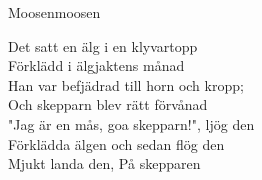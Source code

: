 \begin{song}{Moosen}{moosen}
\begin{vers}
Det satt en älg i en klyvartopp\\
Förklädd i älgjaktens månad\\
Han var befjädrad till horn och kropp;\\
Och skepparn blev rätt förvånad\\
"Jag är en mås, goa skepparn!", ljög den\\
Förklädda älgen och sedan flög den\\
Mjukt landa den,
På skepparen\\
\end{vers}
\end{song}
